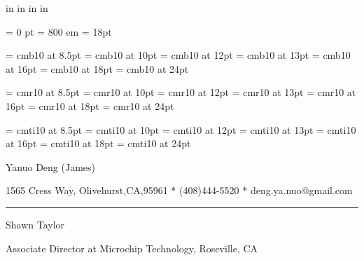 



 in     %
 in    %
 in  %
 in  %

\nopagenumbers

\parindent = 0 pt
\emergencystretch = 800 em
\baselineskip = 18pt


\font\FFba=      cmb10            at 8.5pt
\font\FFbb=      cmb10            at 10pt
\font\FFbc=      cmb10            at 12pt
\font\FFbd=      cmb10            at 13pt
\font\FFbe=      cmb10            at 16pt
\font\FFbf=      cmb10            at 18pt
\font\FFbg=      cmb10            at 24pt

\font\FFra=      cmr10            at 8.5pt
\font\FFrb=      cmr10            at 10pt
\font\FFrc=      cmr10            at 12pt
\font\FFrd=      cmr10            at 13pt
\font\FFre=      cmr10            at 16pt
\font\FFrf=      cmr10            at 18pt
\font\FFrg=      cmr10            at 24pt

\font\FFta=      cmti10           at 8.5pt
\font\FFtb=      cmti10           at 10pt
\font\FFtc=      cmti10           at 12pt
\font\FFtd=      cmti10           at 13pt
\font\FFte=      cmti10           at 16pt
\font\FFtf=      cmti10           at 18pt
\font\FFtg=      cmti10           at 24pt


\FFrd

{
Yanuo Deng (James)
}

{ 
1565 Cress Way, Olivehurst,CA,95961
*
(408)444-5520
*
deng.ya.nuo@gmail.com
}

{ \smallbreak } 
{\par\noindent\hrule} 
{ \medbreak } { 
}

{ \medbreak } { 
Shawn Taylor
}

Associate Director at Microchip Technology, Roseville, CA

